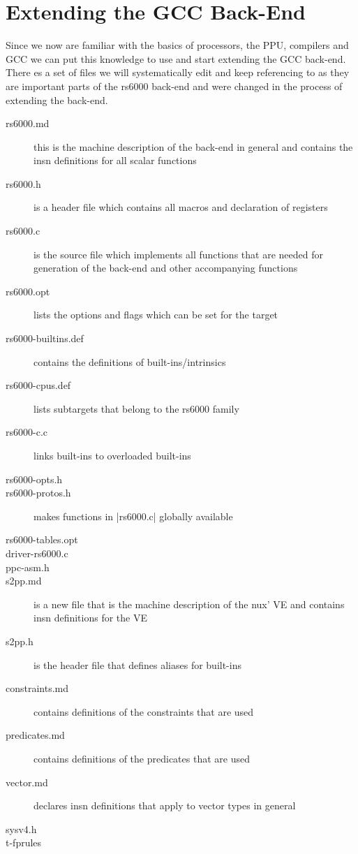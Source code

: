 \chapter{Extending the GCC Back-End}
\label{chapter:extbackend}
Since we now are familiar with the basics of processors, the PPU, compilers and GCC we can put this knowledge to use and start extending the GCC back-end.
There es a set of files we will systematically edit and keep referencing to as they are important parts of the rs6000 back-end and were changed in the process of extending the back-end. 
\begin{description}
    \item[rs6000.md] this is the machine description of the back-end in general and contains the insn definitions for all scalar functions
    \item[rs6000.h] is a header file which contains all macros and declaration of registers
    \item[rs6000.c] is the source file which implements all functions that are needed for generation of the back-end and other accompanying functions
    \item[rs6000.opt] lists the options and flags which can be set for the target
    \item[rs6000-builtins.def] contains the definitions of built-ins/intrinsics
    \item[rs6000-cpus.def] lists subtargets that belong to the rs6000 family
    \item[rs6000-c.c] links built-ins to overloaded built-ins
    \item[rs6000-opts.h] 
    \item[rs6000-protos.h] makes functions in |rs6000.c| globally available
    \item[rs6000-tables.opt]
    \item[driver-rs6000.c]
    \item[ppc-asm.h]
    \item[s2pp.md] is a new file that is the machine description of the nux' VE and contains insn definitions for the VE
    \item[s2pp.h] is the header file that defines aliases for built-ins
    \item[constraints.md] contains definitions of the constraints that are used
    \item[predicates.md] contains definitions of the predicates that are used
    \item[vector.md] declares insn definitions that apply to vector types in general
    \item[sysv4.h]
    \item[t-fprules]
\end{description}

